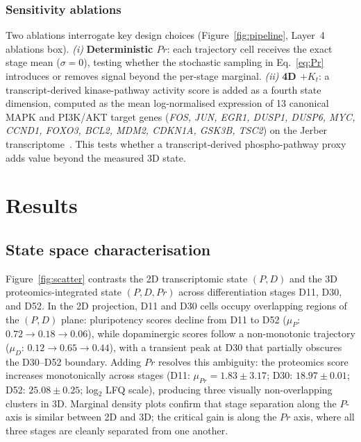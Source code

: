 \documentclass[5p,times,twocolumn]{elsarticle}
\begin{document}
\subsubsection{Sensitivity ablations}
\label{sec:ablations}

Two ablations interrogate key design choices
(Figure~\ref{fig:pipeline}, Layer~4 ablations box).
\textit{(i)} \textbf{Deterministic $Pr$}: each trajectory
cell receives the exact stage mean ($\sigma = 0$), testing
whether the stochastic sampling in Eq.~\eqref{eq:Pr}
introduces or removes signal beyond the per-stage marginal.
\textit{(ii)} \textbf{4D $+ K_{t}$}: a transcript-derived
kinase-pathway activity score is added as a fourth state
dimension, computed as the mean log-normalised expression
of 13 canonical MAPK and PI3K/AKT target genes
(\textit{FOS, JUN, EGR1, DUSP1, DUSP6, MYC, CCND1,
FOXO3, BCL2, MDM2, CDKN1A, GSK3B, TSC2})
on the Jerber transcriptome~\cite{jerber2021population}.
This tests whether a transcript-derived phospho-pathway
proxy adds value beyond the measured 3D state.







\section{Results}
\label{sec:results}

\subsection{\textbf{State space characterisation}}
\label{sec:res_state}

Figure~\ref{fig:scatter} contrasts the 2D transcriptomic state
$(P, D)$ and the 3D proteomics-integrated state $(P, D, Pr)$
across differentiation stages D11, D30, and D52.
In the 2D projection, D11 and D30 cells occupy overlapping
regions of the $(P, D)$ plane: pluripotency scores decline
from D11 to D52 ($\mu_{P}$: $0.72 \to 0.18 \to 0.06$),
while dopaminergic scores follow a non-monotonic trajectory
($\mu_{D}$: $0.12 \to 0.65 \to 0.44$), with a transient
peak at D30 that partially obscures the D30--D52 boundary.
Adding $Pr$ resolves this ambiguity: the proteomics score
increases monotonically across stages
(D11: $\mu_{Pr} = 1.83 \pm 3.17$;
D30: $18.97 \pm 0.01$;
D52: $25.08 \pm 0.25$; log$_{2}$ LFQ scale),
producing three visually non-overlapping clusters in 3D.
Marginal density plots confirm that stage separation along the
$P$-axis is similar between 2D and 3D; the critical gain is
along the $Pr$ axis, where all three stages are cleanly
separated from one another.
\end{document}
